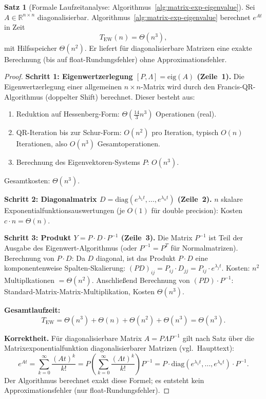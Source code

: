 \documentclass[a4paper,12pt]{report}
\theoremstyle{definition}
\newtheorem{satz}{Satz}
\begin{document}
	\begin{satz}[Formale Laufzeitanalyse: Algorithmus~\ref{alg:matrix-exp-eigenvalue}]
		\label{satz:laufzeit-eigenvalue-method}
		Sei $A \in \mathbb{R}^{n \times n}$ diagonalisierbar. Algorithmus~\ref{alg:matrix-exp-eigenvalue} berechnet $e^{At}$ in Zeit
		\[
			T_{\mathrm{EW}}(n) = \Theta(n^3),
		\]
		mit Hilfsspeicher $\Theta(n^2)$. Er liefert für diagonalisierbare Matrizen eine exakte Berechnung (bis auf float-Rundungsfehler) ohne Approximationsfehler.
	\end{satz}
	\begin{proof}
		\textbf{Schritt 1: Eigenwertzerlegung $[P, \Lambda] = \mathrm{eig}(A)$ (Zeile~1).}
		Die Eigenwertzerlegung einer allgemeinen $n{\times}n$-Matrix wird durch den Francis-QR-Algorithmus (doppelter Shift) berechnet. Dieser besteht aus:
		\begin{enumerate}
			\item Reduktion auf Hessenberg-Form: $\Theta\!\left(\frac{14}{3}n^3\right)$ Operationen (real).
			\item QR-Iteration bis zur Schur-Form: $O(n^2)$ pro Iteration, typisch $O(n)$ Iterationen, also $O(n^3)$ Gesamtoperationen.
			\item Berechnung des Eigenvektoren-Systems $P$: $O(n^3)$.
		\end{enumerate}
		Gesamtkosten: $\Theta(n^3)$.

		\textbf{Schritt 2: Diagonalmatrix $D = \mathrm{diag}(e^{\lambda_1 t}, \ldots, e^{\lambda_n t})$ (Zeile~2).}
		$n$ skalare Exponentialfunktionsauswertungen (je $O(1)$ für double precision): Kosten $c \cdot n = \Theta(n)$.

		\textbf{Schritt 3: Produkt $Y = P \cdot D \cdot P^{-1}$ (Zeile~3).}
		Die Matrix $P^{-1}$ ist Teil der Ausgabe des Eigenwert-Algorithmus (oder $P^{-1} = P^T$ für Normalmatrizen). Berechnung von $P \cdot D$: Da $D$ diagonal, ist das Produkt $P \cdot D$ eine komponentenweise Spalten-Skalierung:
		$(PD)_{ij} = P_{ij} \cdot D_{jj} = P_{ij} \cdot e^{\lambda_j t}$.
		Kosten: $n^2$ Multiplkationen $= \Theta(n^2)$.
		Anschließend Berechnung von $(PD) \cdot P^{-1}$: Standard-Matrix-Matrix-Multiplikation, Kosten $\Theta(n^3)$.

		\textbf{Gesamtlaufzeit:}
		\[
			T_{\mathrm{EW}} = \Theta(n^3) + \Theta(n) + \Theta(n^2) + \Theta(n^3) = \Theta(n^3).
		\]

		\textbf{Korrektheit.} Für diagonalisierbare Matrix $A = P\Lambda P^{-1}$ gilt nach Satz über die Matrixexponentialfunktion diagonalisierbarer Matrizen (vgl.\ Haupttext):
		\[
			e^{At} = \sum_{k=0}^\infty \frac{(At)^k}{k!} = P \left(\sum_{k=0}^\infty \frac{(\Lambda t)^k}{k!}\right) P^{-1} = P \cdot \mathrm{diag}(e^{\lambda_1 t}, \ldots, e^{\lambda_n t}) \cdot P^{-1}.
		\]
		Der Algorithmus berechnet exakt diese Formel; es entsteht kein Approximationsfehler (nur float-Rundungsfehler).


\end{proof}
\end{document}
